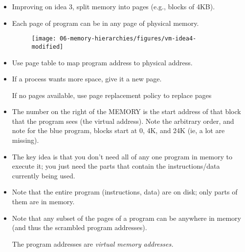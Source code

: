\begin{frame}[fragile]
\begin{itemize}
    \item Improving on idea 3, split memory into pages (e.g., blocks of 4KB).  
    \item Each page of program can be in any page of physical memory.

\begin{figure}[H]
\centering
	{\texttt{[image: 06-memory-hierarchies/figures/vm-idea4-modified]}}
\end{figure}

    \item Use page table to map program address to physical address.
    \item If a process wants more space, give it a new page.

	If no pages available, use page replacement policy to replace pages 
\end{itemize}
\BNotes\ifnum{}
\begin{itemize}
    \item The number on the right of the MEMORY is the start address of that block that the program sees (the virtual address).  Note the arbitrary order, and note for the blue program, blocks start at 0, 4K, and 24K (ie, a lot are missing).
	\item The key idea is that you don't need all of any one program
		in memory to execute it; you just need the parts that
		contain the instructions/data currently being used.
	\item Note that the entire program (instructions, data) are on
		disk; only parts of them are in memory.
	\item Note that any subset of the pages of a program can be anywhere
		in memory (and thus the scrambled program addresses).

		The program addresses are {\it virtual memory addresses.}
\end{itemize}
\fi\ENotes
\end{frame}

